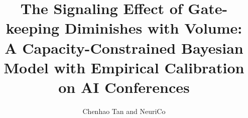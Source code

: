 \documentclass{article}
\title{The Signaling Effect of Gate-keeping Diminishes with Volume:\\
A Capacity-Constrained Bayesian Model with Empirical Calibration on AI Conferences}
\author{Chenhao Tan and NeuriCo}
\begin{document}
\maketitle

\begin{abstract}

\end{abstract}









\end{document}
